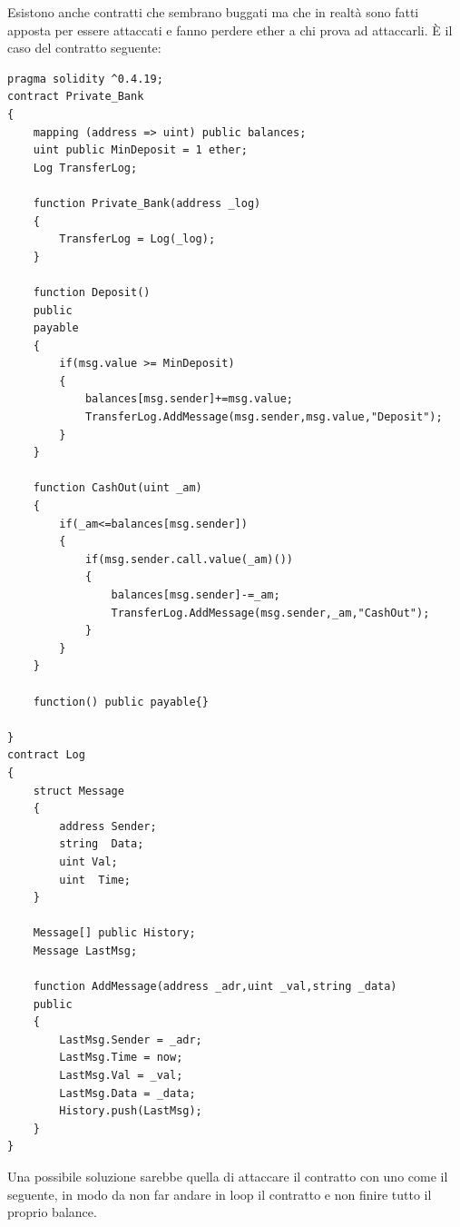 Esistono anche contratti che sembrano buggati ma che in realtà sono fatti apposta per essere attaccati e fanno perdere ether a chi prova ad attaccarli. È il caso del contratto seguente:
\begin{lstlisting}[language=Solidity]
pragma solidity ^0.4.19;
contract Private_Bank
{
    mapping (address => uint) public balances;
    uint public MinDeposit = 1 ether;
    Log TransferLog;
    
    function Private_Bank(address _log)
    {
        TransferLog = Log(_log);
    }
    
    function Deposit()
    public
    payable
    {
        if(msg.value >= MinDeposit)
        {
            balances[msg.sender]+=msg.value;
            TransferLog.AddMessage(msg.sender,msg.value,"Deposit");
        }
    }
    
    function CashOut(uint _am)
    {
        if(_am<=balances[msg.sender])
        {
            if(msg.sender.call.value(_am)())
            {
                balances[msg.sender]-=_am;
                TransferLog.AddMessage(msg.sender,_am,"CashOut");
            }
        }
    }
    
    function() public payable{}    
    
}
contract Log 
{
    struct Message
    {
        address Sender;
        string  Data;
        uint Val;
        uint  Time;
    }
    
    Message[] public History;
    Message LastMsg;
    
    function AddMessage(address _adr,uint _val,string _data)
    public
    {
        LastMsg.Sender = _adr;
        LastMsg.Time = now;
        LastMsg.Val = _val;
        LastMsg.Data = _data;
        History.push(LastMsg);
    }
}
\end{lstlisting}
Una possibile soluzione sarebbe quella di attaccare il contratto con uno come il seguente, in modo da non far andare in loop il contratto e non finire tutto il proprio balance. 
